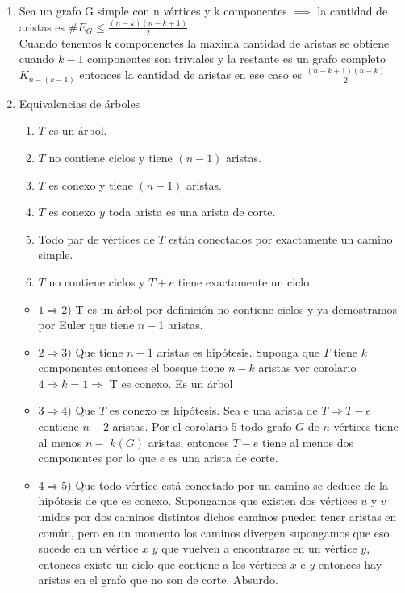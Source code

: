 \documentclass{article}
\begin{document}
\begin{enumerate}
    \item Sea un grafo G simple con n vértices y k componentes $\implies$ la cantidad de aristas es $\#E_G\leq \frac{(n-k)(n-k+1)}{2}$ \\
    Cuando tenemos k componenetes la maxima cantidad de aristas se obtiene cuando $k-1$ componentes son triviales y la restante es un grafo completo $K_{n-(k-1)}$ entonces la cantidad de aristas en ese caso es $\frac{(n-k+1)(n-k)}{2}$
    
    \item Equivalencias de árboles
    \begin{enumerate}
    \item $T$ es un árbol.
    \item$T$ no contiene ciclos y tiene $(n-1)$ aristas.
    \item$T$ es conexo y tiene $(n-1)$ aristas.
    \item$T$ es conexo $y$ toda arista es una arista de corte.
    \item Todo par de vértices de $T$ están conectados por exactamente un camino simple.
    \item$T$ no contiene ciclos y $T+e$ tiene exactamente un ciclo.
    \end{enumerate}
    \begin{itemize}
        \item $1 \Rightarrow 2)$ T es un árbol por definición no contiene ciclos y ya demostramos por Euler que tiene $n-1$ aristas.
        \item $2 \Rightarrow 3)$ Que tiene $n-1$ aristas es hipótesis. Suponga que $T$ tiene $k$ componentes entonces el bosque tiene $n-k$ aristas ver corolario $4 \Rightarrow k=1 \Rightarrow$ T es conexo. Es un árbol 
        \item $3\Rightarrow 4)$ Que $T$ es conexo es hipótesis. Sea e una arista de $T \Rightarrow T-e$ contiene $n-2$ aristas. Por el corolario 5 todo grafo $G$ de $n$ vértices tiene al menos $n-$ $k(G)$ aristas, entonces $T-e$ tiene al menos dos componentes por lo que $e$ es una arista de corte.
        \item $4\Rightarrow 5)$ Que todo vértice está conectado por un camino se deduce de la hipótesis de que es conexo. Supongamos que existen dos vértices $u$ y $v$ unidos por dos caminos distintos dichos caminos pueden tener aristas en común, pero en un momento los caminos divergen supongamos que eso sucede en un vértice $x$  $y$ que vuelven a encontrarse en un vértice $y$, entonces existe un ciclo que contiene a los vértices $x$ e $y$ entonces hay aristas en el grafo que no son de corte. Absurdo.

\end{itemize}
\end{enumerate}
\end{document}
